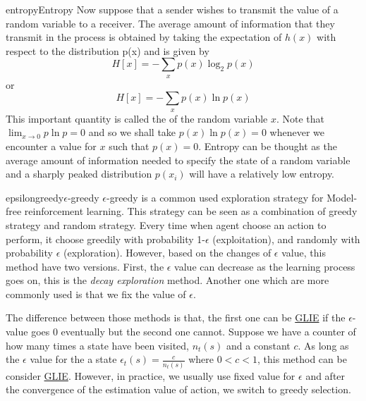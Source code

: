 \documentclass[9pt]{article}
\begin{document}
\begin{topic}{entropy}{Entropy}
Now suppose that a sender wishes to transmit the value of a random variable to a receiver. The average amount of information that they transmit in the process is obtained by taking the expectation of $h(x)$ with respect to the distribution p(x) and is given by
\[
H[x] = -\sum_x p(x) \log_2 p(x)
\]
or
\[
H[x] = -\sum_x p(x) \ln p(x)
\]
This important quantity is called the \textit{\color{red}{entropy}} of the random variable $x$. Note that $\lim_{x\to 0}p \ln p = 0$ and so we shall take $p(x) \ln p(x) = 0$ whenever we encounter a value for $x$ such that $p(x) = 0$.  Entropy can be thought as the average amount of information needed to specify the state of a random variable and a sharply peaked distribution $p(x_i)$ will have a relatively low entropy. 


\end{topic}
\begin{topic}{epsilongreedy}{\texorpdfstring{$\epsilon$}--greedy}
$\epsilon$-greedy is a common used exploration strategy for Model-free reinforcement learning. This strategy can be seen as a combination of greedy strategy and random strategy. Every time when agent choose an action to perform, it choose greedily with probability 1-$\epsilon$ (exploitation), and randomly with probability $\epsilon$ (exploration). However, based on the changes of $\epsilon$ value, this method have two versions. First, the $\epsilon$ value can decrease as the learning process goes on, this is the \textit{decay exploration} method. Another one which are more commonly used is that we fix the value of $\epsilon$. 

The difference between those methods is that, the first one can be \hyperlink{glie}{GLIE} if the $\epsilon$-value goes 0 eventually but the second one cannot. Suppose we have a counter of how many times a state have been visited, $n_t(s)$ and a constant $c$. As long as the $\epsilon$ value for the a state $\epsilon_t(s) = \frac{c}{n_t(s)}$ where $0<c<1$, this method can be consider \hyperlink{glie}{GLIE}. However, in practice, we usually use fixed value for $\epsilon$ and after the convergence of the estimation value of action, we switch to greedy selection. 
\end{topic}
\end{document}
